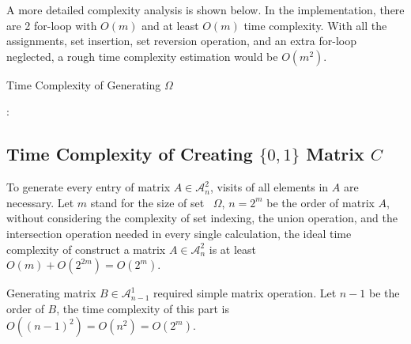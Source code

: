 \documentclass[11pt]{article}
\begin{document}
A more detailed complexity analysis is shown below. In the implementation, there are 2 for-loop with $O(m)$ and at least $O(m)$ time complexity. With all the assignments, set insertion, set reversion operation, and an extra for-loop neglected, a rough time complexity estimation would be $O(m^2)$.

\begin{algorithm}[H] 
    \caption{Time Complexity of Generating $\Omega$}
    \label{alg:loop_tc}
    \begin{algorithmic}[1]
    \Ensure{$\Omega$}
         
                      
             
                 
                :
                     
                \EndIf
                 
                     
                \EndFor
            \EndFor
        \EndFor
        \State \Return {$\Omega$}
    \end{algorithmic}
\end{algorithm}

\subsection{Time Complexity of Creating $\{0, 1\}$ Matrix $C$}
To generate every entry of matrix $A \in \mathcal{A}_n^2$, visits of all elements in $A$ are necessary. Let $m$ stand for the size of set  $\Omega$, $n=2^m$ be the order of matrix $A$, without considering the complexity of set indexing, the union operation, and the intersection operation needed in every single calculation, the ideal time complexity of construct a matrix $A \in \mathcal{A}_n^2$ is at least $O(m) + O(2^{2m}) = O(2^m)$.

Generating matrix $B\in \mathcal{A}_{n - 1}^1$ required simple matrix operation. Let $n - 1$ be the order of $B$, the time complexity of this part is $O((n-1)^2) = O(n^2) = O(2^m)$.
\end{document}
